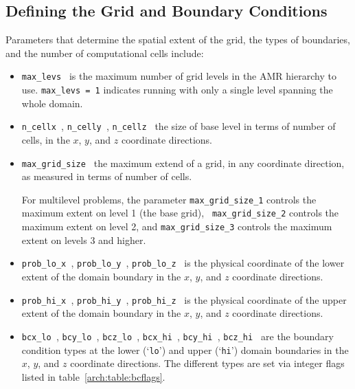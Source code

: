 \subsection{Defining the Grid and Boundary Conditions}

Parameters that determine the spatial extent of the grid, 
the types of boundaries, and the number of computational cells include:
\begin{itemize}

\item {\tt max\_levs } is the maximum number of grid levels in the AMR
  hierarchy to use.  {\tt max\_levs = 1} indicates running with only a
  single level spanning the whole domain.

\item {\tt n\_cellx }, {\tt n\_celly }, {\tt n\_cellz } the size of
  base level in terms of number of cells, in the $x$, $y$, and $z$
  coordinate directions.

\item {\tt max\_grid\_size } the maximum extend of a grid, in any
  coordinate direction, as measured in terms of number of cells.

  For multilevel problems, the parameter {\tt max\_grid\_size\_1}
  controls the maximum extent on level 1 (the base grid), {\tt
    max\_grid\_size\_2} controls the maximum extent on level 2, and
  {\tt max\_grid\_size\_3} controls the maximum extent on levels 3 and
  higher.

\item {\tt prob\_lo\_x }, {\tt prob\_lo\_y }, {\tt prob\_lo\_z } is
  the physical coordinate of the lower extent of the domain boundary
  in the $x$, $y$, and $z$ coordinate directions.

\item {\tt prob\_hi\_x }, {\tt prob\_hi\_y }, {\tt prob\_hi\_z } is
  the physical coordinate of the upper extent of the domain boundary
  in the $x$, $y$, and $z$ coordinate directions.

\item {\tt bcx\_lo }, {\tt bcy\_lo }, {\tt bcz\_lo }, 
      {\tt bcx\_hi }, {\tt bcy\_hi }, {\tt bcz\_hi } are the boundary
   condition types at the lower (`{\tt lo}') and upper (`{\tt hi}')
   domain boundaries in the $x$, $y$, and $z$ coordinate directions.
   The different types are set via integer flags listed in table~\ref{arch:table:bcflags}.


\end{itemize}
